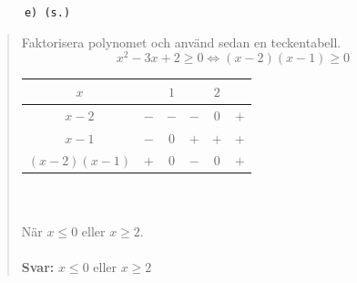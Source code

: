 \documentclass[a4paper]{article}
\newcommand{\tskcol}[1]{\textcolor{tskcol}{#1}}
\begin{document}
	\texttt{\tskcol{~~~~~~e) (s.)}}
	\begin{quotation}
		\noindent
		Faktorisera polynomet och använd sedan en teckentabell.
		\[x^2-3x+2 \ge 0 \Leftrightarrow
		(x-2)(x-1) \ge 0\]
		\begin{tabular}{c|c|c|c|c|c}
			$x$                     &     & $1$ &     & $2$ &     \\ \hline
			$x-2$                   & $-$ & $-$ & $-$ & $0$ & $+$ \\
			$x-1$                   & $-$ & $0$ & $+$ & $+$ & $+$ \\ \hline
			$(x-2)(x-1)$  			& $+$ & $0$ & $-$ & $0$ & $+$ \\
		\end{tabular} \\ \\
		När $x \le 0$ eller $x \ge 2$.
		\\ \\
		\textbf{Svar:} $x \le 0$ eller $x \ge 2$
	\end{quotation}
	
\end{document}
